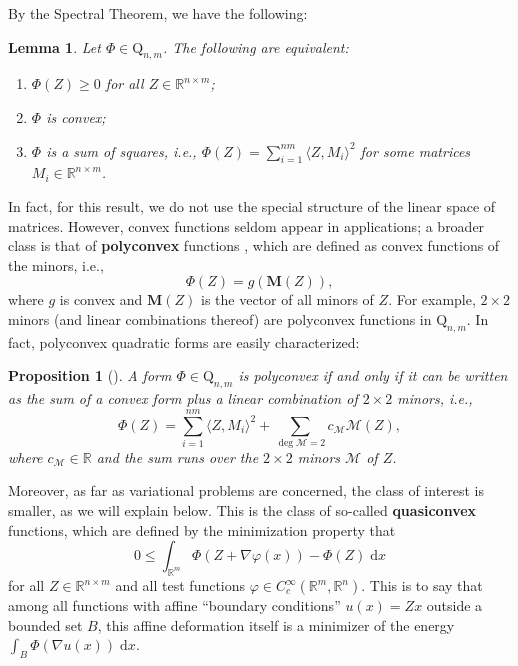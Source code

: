 \documentclass[a4paper]{article}
\numberwithin{equation}{section}
\newcommand{\R}{\mathbb{R}}
\newtheorem{lemma}[theorem]{Lemma}
\newtheorem{prop}[theorem]{Proposition}
\theoremstyle{definition}
\theoremstyle{remark}
\newcommand{\qnm}{\mathrm{Q}_{n,m}}
\begin{document}
By the Spectral Theorem, we have the following:
\begin{lemma}\label{lem:convex}
Let $\Phi\in\qnm$. The following are equivalent:
\begin{enumerate}
    \item $\Phi(Z)\geq 0$ for all $Z\in\R^{n\times m}$;
    \item $\Phi$ is convex;
    \item $\Phi$ is a sum of squares, i.e., $\Phi(Z)=\sum_{i=1}^{nm}\langle Z, M_i\rangle^2$  for some matrices $M_i\in\R^{n\times m}$.
\end{enumerate}
\end{lemma}
In fact, for this result, we do not use the special structure of the linear space of matrices. However, convex functions seldom appear in applications; a broader class is that of \textbf{polyconvex} functions \cite{ball77,morrey52}, which are defined as convex functions of the minors, i.e.,
$$
\Phi(Z)=g(\mathbf{M}(Z)),
$$
where $g$ is convex and $\mathbf M(Z)$ is the vector of all minors of $Z$. 
For example, $2\times 2$ minors (and linear combinations thereof) are polyconvex functions in $\qnm$. In fact, polyconvex quadratic forms are easily characterized:
\begin{prop}[\cite{vanhovezbMATH03046021}]
\label{prop:polyconvex}
A form $\Phi\in\qnm$ is polyconvex if and only if it can be written as the sum of a convex form plus a linear combination of $2\times 2$ minors, i.e.,
$$\Phi(Z)=\sum_{i=1}^{nm}\langle Z, M_i\rangle^2+\sum_{\deg \mathcal M=2}c_{\mathcal M} \mathcal M(Z),$$
where $c_\mathcal{M}\in \R$ and the sum runs over the $2\times 2$ minors $\mathcal M$ of $Z$.
\end{prop}

Moreover, as far as variational problems are concerned, the class of interest is smaller, {as we will explain below}. This is the class of so-called \textbf{quasiconvex} functions, which are defined by the minimization property that
$$
0\leq \int_{\R^m} \Phi(Z+\nabla \varphi(x))-\Phi(Z)\mathrm{\;d} x
$$
for all $Z\in\R^{n\times m}$ and all test functions $\varphi\in C_c^\infty(\R^m,\R^n)$. This is to say that among all functions with affine ``boundary conditions'' $u(x)= Zx$ outside a bounded set $B$, 
this affine deformation itself is a minimizer of the energy $\int_B \Phi(\nabla u(x))\mathrm{\;d}x$.
\end{document}
